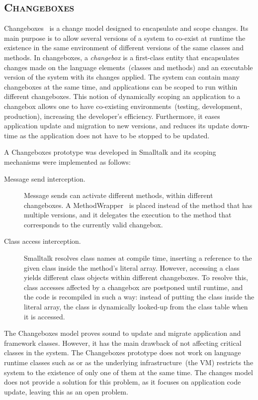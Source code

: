 \subsection*{\textsc{Changeboxes}}

Changeboxes~\cite{Denk07c} is a change model designed to encapsulate and scope changes. Its main purpose is to allow several versions of a system to co-exist at runtime \ie the existence in the same environment of different versions of the same classes and methods. In changeboxes, a \emph{changebox} is a first-class entity that encapsulates changes made on the language elements~(\eg classes and methods) and an executable version of the system with its changes applied. The system can contain many changeboxes at the same time, and applications can be scoped to run within different changeboxes. This notion of dynamically scoping an application to a changebox allows one to have co-existing environments~(\eg testing, development, production), increasing the developer's efficiency. Furthermore, it eases application update and migration to new versions, and reduces its update down-time as the application does not have to be stopped to be updated.

A Changeboxes prototype was developed in Smalltalk and its scoping mechanisms were implemented as follows:

\begin{description}
\item[Message send interception.] Message sends can activate different methods, within different changeboxes. A MethodWrapper~\cite{Bran98a} is placed instead of the method that has multiple versions, and it delegates the execution to the method that corresponds to the currently valid changebox.

\item[Class access interception.] Smalltalk resolves class names at compile time, inserting a reference to the given class inside the method's literal array. However, accessing a class yields different class objects within different changeboxes. To resolve this, class accesses affected by a changebox are postponed until runtime, and the code is recompiled in such a way: instead of putting the class inside the literal array, the class is dynamically looked-up from the class table when it is accessed.
\end{description}

The Changeboxes model proves sound to update and migrate application and framework classes. However, it has the main drawback of not affecting critical classes in the system. The Changeboxes prototype does not work on language runtime classes such as  or  as the underlying infrastructure~(the VM) restricts the system to the existence of only one of them at the same time. The changes model does not provide a solution for this problem, as it focuses on application code update, leaving this as an open problem.

